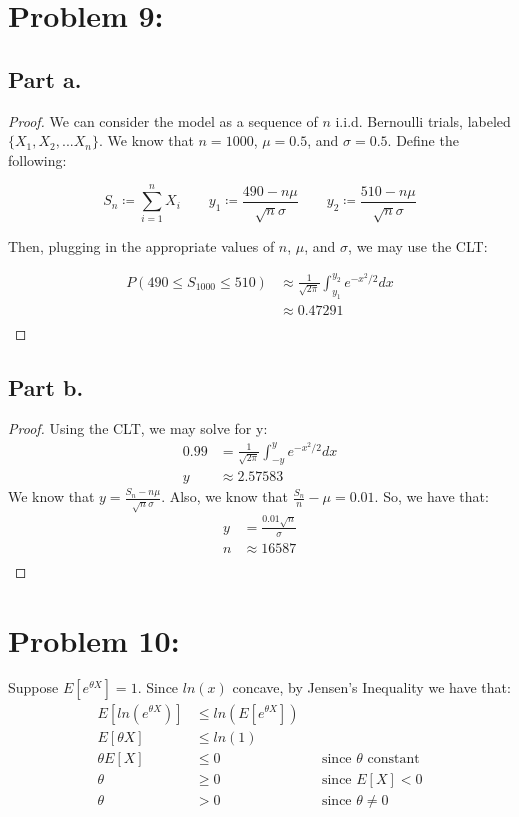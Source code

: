 \documentclass{article}
\begin{document}
\section*{Problem 9:}

\subsection*{Part a.}

\begin{proof}
We can consider the model as a sequence of $n$ i.i.d. Bernoulli trials, labeled $\{X_1, X_2, ... X_n\}$. We know that $n = 1000$, $\mu = 0.5$, and $\sigma = 0.5$. Define the following:

$$
S_{n} \coloneqq \sum_{i = 1}^{n} X_i \qquad
y_1 \coloneqq \frac{490 - n\mu}{\sqrt{n}\sigma} \qquad
y_2 \coloneqq \frac{510 - n\mu}{\sqrt{n}\sigma}
$$

Then, plugging in the appropriate values of $n$, $\mu$, and $\sigma$, we may use the CLT:

\begin{align*}
P(490 \leq S_{1000} \leq 510) &\approx \frac{1}{\sqrt{2\pi}} \int_{y_1}^{y_2} e^{- x^2 / 2} dx \\
&\approx 0.47291 \\
\end{align*}
\end{proof}

\subsection*{Part b.}

\begin{proof}
Using the CLT, we may solve for y:
\begin{align*}
0.99 &= \frac{1}{\sqrt{2\pi}} \int_{-y}^{y} e^{- x^2 / 2} dx \\
y &\approx 2.57583
\end{align*}
We know that $y = \frac{S_n - n\mu}{\sqrt{n}\sigma}$. Also, we know that $\frac{S_n}{n} - \mu = 0.01$. So, we have that:
\begin{align*}
y &= \frac{0.01\sqrt{n}}{\sigma} \\
n &\approx 16587 \\
\end{align*}
\end{proof}

\section*{Problem 10:}

Suppose $E[e^{\theta X}] = 1$. Since $ln(x)$ concave, by Jensen's Inequality we have that:
\begin{align*}
E[ln(e^{\theta X})] &\leq ln(E[e^{\theta X}]) \\
E[\theta X] &\leq ln(1) \\
\theta E[X] &\leq 0 &&\text{since $\theta$ constant} \\
\theta &\geq 0 &&\text{since $E[X] < 0$} \\
\theta &> 0 &&\text{since $\theta \ne 0$} \\
\end{align*}
\end{document}
